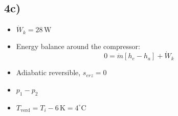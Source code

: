 

\subsection*{4c)}

\begin{itemize}
    \item \( \dot{W}_k = 28 \, \text{W} \)
    \item Energy balance around the compressor:
    \[
    0 = \dot{m} \left[ h_e - h_a \right] + \dot{W}_k
    \]
    \item Adiabatic reversible, \( s_{erz} = 0 \)
    \item \( p_1 - p_2 \)
    \item \( T_{\text{verd}} = T_i - 6 \, \text{K} = 4^\circ \text{C} \)
\end{itemize}